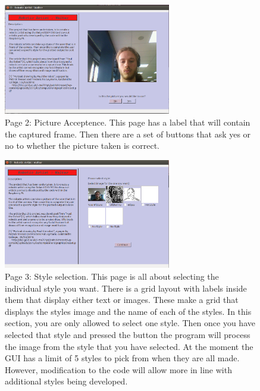 \documentclass{article}
\begin{document}
\begin{figure}[h]
    \centering
    \includegraphics[width=0.65\textwidth]{page2.png}
    \caption{Page 2: Picture Acceptence. This page has a label that will contain the captured frame. Then there are a set of buttons that ask yes or no to whether the picture taken is correct.}
    \label{fig:page_2}
\end{figure}

\begin{figure}[h]
    \centering
    \includegraphics[width=0.65\textwidth]{page3.png}
    \caption{Page 3: Style selection. This page is all about selecting the individual style you want. There is a grid layout with labels inside them that display either text or images. These make a grid that displays the styles image and the name of each of the styles. In this section, you are only allowed to select one style. Then once you have selected that style and pressed the button the program will process the image from the style that you have selected. At the moment the GUI has a limit of 5 styles to pick from when they are all made. However, modification to the code will allow more in line with additional styles being developed.}
    \label{fig:page_3}
\end{figure}
\end{document}
